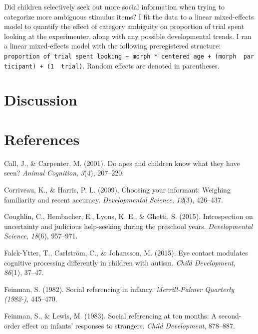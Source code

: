 \documentclass[man]{apa6}
\theoremstyle{definition}
\theoremstyle{definition}
\theoremstyle{definition}
\theoremstyle{remark}
\begin{document}
Did children selectively seek out more social information when trying to
categorize more ambiguous stimulus items? I fit the data to a linear
mixed-effects model to quantify the effect of category ambiguity on
proportion of trial spent looking at the experimenter, along with any
possible developmental trends. I ran a linear mixed-effects model with
the following preregistered structure:
\texttt{proportion\ of\ trial\ spent\ looking\ \textasciitilde{}\ morph\ *\ centered\ age\ +\ (morph\ \textbar{}\ participant)\ +\ (1\ \textbar{}\ trial)}.
Random effects are denoted in parentheses.

\section{Discussion}\label{discussion}

\newpage

\section{References}\label{references}

\setlength{\parindent}{-0.5in} \setlength{\leftskip}{0.5in}

\hypertarget{refs}{}
\hypertarget{ref-call2001apes}{}
Call, J., \& Carpenter, M. (2001). Do apes and children know what they
have seen? \emph{Animal Cognition}, \emph{3}(4), 207--220.

\hypertarget{ref-corriveau2009choosing}{}
Corriveau, K., \& Harris, P. L. (2009). Choosing your informant:
Weighing familiarity and recent accuracy. \emph{Developmental Science},
\emph{12}(3), 426--437.

\hypertarget{ref-coughlin2015introspection}{}
Coughlin, C., Hembacher, E., Lyons, K. E., \& Ghetti, S. (2015).
Introspection on uncertainty and judicious help-seeking during the
preschool years. \emph{Developmental Science}, \emph{18}(6), 957--971.

\hypertarget{ref-falck2015eye}{}
Falck-Ytter, T., Carlström, C., \& Johansson, M. (2015). Eye contact
modulates cognitive processing differently in children with autism.
\emph{Child Development}, \emph{86}(1), 37--47.

\hypertarget{ref-feinman1982social}{}
Feinman, S. (1982). Social referencing in infancy. \emph{Merrill-Palmer
Quarterly (1982-)}, 445--470.

\hypertarget{ref-feinman1983social}{}
Feinman, S., \& Lewis, M. (1983). Social referencing at ten months: A
second-order effect on infants' responses to strangers. \emph{Child
Development}, 878--887.
\end{document}
